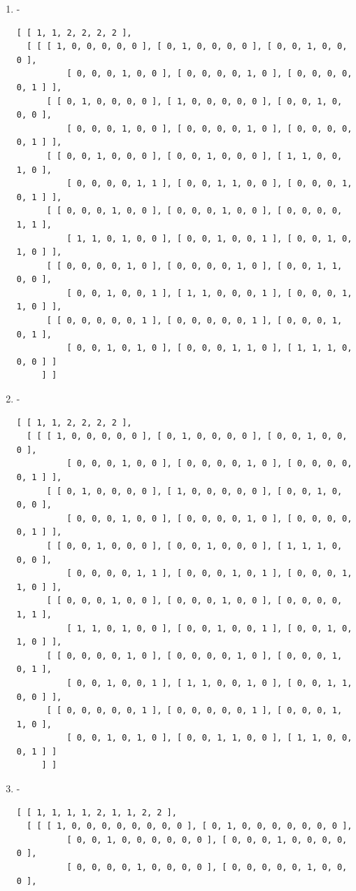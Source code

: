 \documentclass[a4paper, 10pt]{book}
\theoremstyle{definition}
\numberwithin{equation}{chapter}
\begin{document}
\begin{appendices}
\begin{enumerate}
	\item -\begin{lstlisting}[numbers=none]
	[ [ 1, 1, 2, 2, 2, 2 ], 
  [ [ [ 1, 0, 0, 0, 0, 0 ], [ 0, 1, 0, 0, 0, 0 ], [ 0, 0, 1, 0, 0, 0 ], 
          [ 0, 0, 0, 1, 0, 0 ], [ 0, 0, 0, 0, 1, 0 ], [ 0, 0, 0, 0, 0, 1 ] ],
      [ [ 0, 1, 0, 0, 0, 0 ], [ 1, 0, 0, 0, 0, 0 ], [ 0, 0, 1, 0, 0, 0 ], 
          [ 0, 0, 0, 1, 0, 0 ], [ 0, 0, 0, 0, 1, 0 ], [ 0, 0, 0, 0, 0, 1 ] ],
      [ [ 0, 0, 1, 0, 0, 0 ], [ 0, 0, 1, 0, 0, 0 ], [ 1, 1, 0, 0, 1, 0 ], 
          [ 0, 0, 0, 0, 1, 1 ], [ 0, 0, 1, 1, 0, 0 ], [ 0, 0, 0, 1, 0, 1 ] ],
      [ [ 0, 0, 0, 1, 0, 0 ], [ 0, 0, 0, 1, 0, 0 ], [ 0, 0, 0, 0, 1, 1 ], 
          [ 1, 1, 0, 1, 0, 0 ], [ 0, 0, 1, 0, 0, 1 ], [ 0, 0, 1, 0, 1, 0 ] ],
      [ [ 0, 0, 0, 0, 1, 0 ], [ 0, 0, 0, 0, 1, 0 ], [ 0, 0, 1, 1, 0, 0 ], 
          [ 0, 0, 1, 0, 0, 1 ], [ 1, 1, 0, 0, 0, 1 ], [ 0, 0, 0, 1, 1, 0 ] ],
      [ [ 0, 0, 0, 0, 0, 1 ], [ 0, 0, 0, 0, 0, 1 ], [ 0, 0, 0, 1, 0, 1 ], 
          [ 0, 0, 1, 0, 1, 0 ], [ 0, 0, 0, 1, 1, 0 ], [ 1, 1, 1, 0, 0, 0 ] ] 
     ] ]
	\end{lstlisting}
	\item  -\begin{lstlisting}[numbers=none]
	[ [ 1, 1, 2, 2, 2, 2 ], 
  [ [ [ 1, 0, 0, 0, 0, 0 ], [ 0, 1, 0, 0, 0, 0 ], [ 0, 0, 1, 0, 0, 0 ], 
          [ 0, 0, 0, 1, 0, 0 ], [ 0, 0, 0, 0, 1, 0 ], [ 0, 0, 0, 0, 0, 1 ] ],
      [ [ 0, 1, 0, 0, 0, 0 ], [ 1, 0, 0, 0, 0, 0 ], [ 0, 0, 1, 0, 0, 0 ], 
          [ 0, 0, 0, 1, 0, 0 ], [ 0, 0, 0, 0, 1, 0 ], [ 0, 0, 0, 0, 0, 1 ] ],
      [ [ 0, 0, 1, 0, 0, 0 ], [ 0, 0, 1, 0, 0, 0 ], [ 1, 1, 1, 0, 0, 0 ], 
          [ 0, 0, 0, 0, 1, 1 ], [ 0, 0, 0, 1, 0, 1 ], [ 0, 0, 0, 1, 1, 0 ] ],
      [ [ 0, 0, 0, 1, 0, 0 ], [ 0, 0, 0, 1, 0, 0 ], [ 0, 0, 0, 0, 1, 1 ], 
          [ 1, 1, 0, 1, 0, 0 ], [ 0, 0, 1, 0, 0, 1 ], [ 0, 0, 1, 0, 1, 0 ] ],
      [ [ 0, 0, 0, 0, 1, 0 ], [ 0, 0, 0, 0, 1, 0 ], [ 0, 0, 0, 1, 0, 1 ], 
          [ 0, 0, 1, 0, 0, 1 ], [ 1, 1, 0, 0, 1, 0 ], [ 0, 0, 1, 1, 0, 0 ] ],
      [ [ 0, 0, 0, 0, 0, 1 ], [ 0, 0, 0, 0, 0, 1 ], [ 0, 0, 0, 1, 1, 0 ], 
          [ 0, 0, 1, 0, 1, 0 ], [ 0, 0, 1, 1, 0, 0 ], [ 1, 1, 0, 0, 0, 1 ] ] 
     ] ]
	\end{lstlisting}
	\item -\begin{lstlisting}[numbers=none]
	[ [ 1, 1, 1, 1, 2, 1, 1, 2, 2 ], 
  [ [ [ 1, 0, 0, 0, 0, 0, 0, 0, 0 ], [ 0, 1, 0, 0, 0, 0, 0, 0, 0 ], 
          [ 0, 0, 1, 0, 0, 0, 0, 0, 0 ], [ 0, 0, 0, 1, 0, 0, 0, 0, 0 ], 
          [ 0, 0, 0, 0, 1, 0, 0, 0, 0 ], [ 0, 0, 0, 0, 0, 1, 0, 0, 0 ], 

\end{lstlisting}
\end{enumerate}
\end{appendices}
\end{document}
